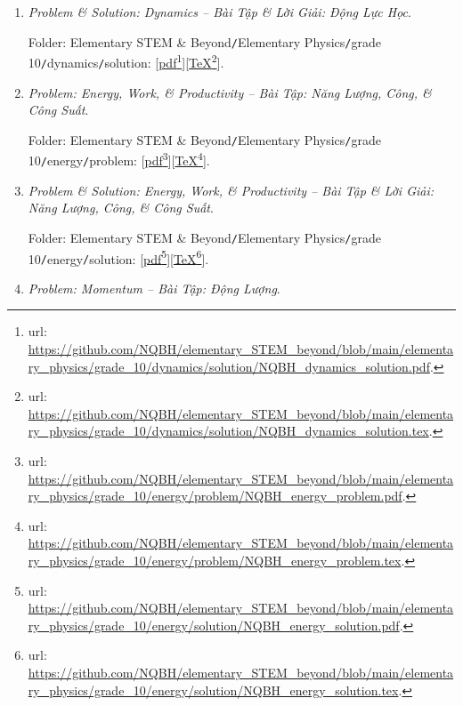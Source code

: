 \documentclass[12pt]{article}
\begin{document}
\begin{enumerate}
	\item {\it Problem \& Solution: Dynamics -- Bài Tập \& Lời Giải: Động Lực Học}.
	
	Folder: {\sf Elementary STEM \& Beyond{\tt/}Elementary Physics{\tt/}grade 10{\tt/}dynamics{\tt/}solution}: [\href{https://github.com/NQBH/elementary_STEM_beyond/blob/main/elementary_physics/grade_10/dynamics/solution/NQBH_dynamics_solution.pdf}{pdf}\footnote{{\sc url}: \url{https://github.com/NQBH/elementary_STEM_beyond/blob/main/elementary_physics/grade_10/dynamics/solution/NQBH_dynamics_solution.pdf}.}][\href{https://github.com/NQBH/elementary_STEM_beyond/blob/main/elementary_physics/grade_10/dynamics/solution/NQBH_dynamics_solution.tex}{\TeX}\footnote{{\sc url}: \url{https://github.com/NQBH/elementary_STEM_beyond/blob/main/elementary_physics/grade_10/dynamics/solution/NQBH_dynamics_solution.tex}.}].
	\item {\it Problem: Energy, Work, \it\& Productivity -- Bài Tập: Năng Lượng, Công, {\it\&} Công Suất}.
	
	Folder: {\sf Elementary STEM \& Beyond{\tt/}Elementary Physics{\tt/}grade 10{\tt/}energy{\tt/}problem}: [\href{https://github.com/NQBH/elementary_STEM_beyond/blob/main/elementary_physics/grade_10/energy/problem/NQBH_energy_problem.pdf}{pdf}\footnote{{\sc url}: \url{https://github.com/NQBH/elementary_STEM_beyond/blob/main/elementary_physics/grade_10/energy/problem/NQBH_energy_problem.pdf}.}][\href{https://github.com/NQBH/elementary_STEM_beyond/blob/main/elementary_physics/grade_10/energy/problem/NQBH_energy_problem.tex}{\TeX}\footnote{{\sc url}: \url{https://github.com/NQBH/elementary_STEM_beyond/blob/main/elementary_physics/grade_10/energy/problem/NQBH_energy_problem.tex}.}].
	
	\item {\it Problem \& Solution: Energy, Work, \it\& Productivity -- Bài Tập \& Lời Giải: Năng Lượng, Công, {\it\&} Công Suất}.
	
	Folder: {\sf Elementary STEM \& Beyond{\tt/}Elementary Physics{\tt/}grade 10{\tt/}energy{\tt/}solution}: [\href{https://github.com/NQBH/elementary_STEM_beyond/blob/main/elementary_physics/grade_10/energy/solution/NQBH_energy_solution.pdf}{pdf}\footnote{{\sc url}: \url{https://github.com/NQBH/elementary_STEM_beyond/blob/main/elementary_physics/grade_10/energy/solution/NQBH_energy_solution.pdf}.}][\href{https://github.com/NQBH/elementary_STEM_beyond/blob/main/eleomentummentary_physics/grade_10/energy/solution/NQBH_energy_solution.tex}{\TeX}\footnote{{\sc url}: \url{https://github.com/NQBH/elementary_STEM_beyond/blob/main/elementary_physics/grade_10/energy/solution/NQBH_energy_solution.tex}.}].
	\item {\it Problem: Momentum -- Bài Tập: Động Lượng}.
	

\end{enumerate}
\end{document}
